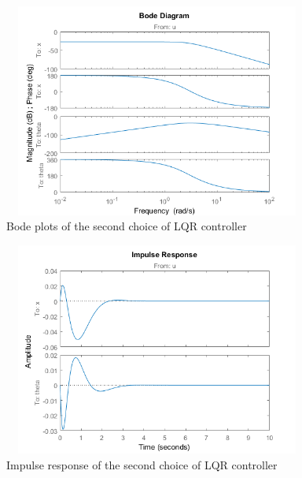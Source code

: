 \documentclass [12pt,letterpaper]{exam}
\begin{document}
\begin{figure}[H]
  \centering
    \includegraphics[width=10.15cm, height=7cm]{lqr2_bode} 
  \caption{Bode plots of the second choice of LQR controller}
  \label{fig:lqr2_bode}
\end{figure}

\begin{figure}[H]
  \centering
    \includegraphics[width=10.15cm, height=7cm]{lqr2_impulse} 
  \caption{Impulse response of the second choice of LQR controller}
  \label{fig:lqr2_impulse}
\end{figure}



\newpage
\end{document}
